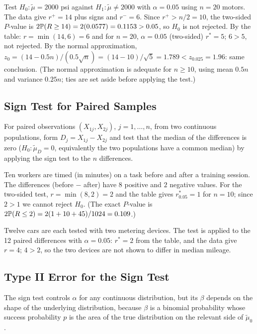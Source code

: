 \begin{example}
Test $H_0:\tilde\mu=2000$ psi against $H_1:\tilde\mu\ne2000$ with $\alpha=0.05$ using $n=20$ motors. The data give $r^+=14$ plus signs and $r^-=6$. Since $r^+>n/2=10$, the two-sided $P$-value is $2\mathbb{P}(R\ge14)=2(0.0577)=0.1153>0.05$, so $H_0$ is not rejected. By the table: $r=\min(14,6)=6$ and for $n=20$, $\alpha=0.05$ (two-sided) $r^*=5$; $6>5$, not rejected. By the normal approximation, $z_0=(14-0.5n)/(0.5\sqrt n)=(14-10)/\sqrt5=1.789<z_{0.025}=1.96$: same conclusion. (The normal approximation is adequate for $n\ge10$, using mean $0.5n$ and variance $0.25n$; ties are set aside before applying the test.)
\end{example}

\subsection{Sign Test for Paired Samples}

For paired observations $(X_{1j},X_{2j})$, $j=1,\dots,n$, from two continuous populations, form $D_j=X_{1j}-X_{2j}$ and test that the median of the differences is zero ($H_0:\tilde\mu_D=0$, equivalently the two populations have a common median) by applying the sign test to the $n$ differences.

\begin{example}
Ten workers are timed (in minutes) on a task before and after a training session. The differences (before $-$ after) have $8$ positive and $2$ negative values. For the two-sided test, $r=\min(8,2)=2$ and the table gives $r^*_{0.05}=1$ for $n=10$; since $2>1$ we cannot reject $H_0$. (The exact $P$-value is $2\mathbb{P}(R\le2)=2(1+10+45)/1024=0.109$.)
\end{example}

\begin{example}
Twelve cars are each tested with two metering devices. The test is applied to the 12 paired differences with $\alpha=0.05$: $r^*=2$ from the table, and the data give $r=4$; $4>2$, so the two devices are not shown to differ in median mileage.
\end{example}

\subsection{Type II Error for the Sign Test}

The sign test controls $\alpha$ for any continuous distribution, but its $\beta$ depends on the shape of the underlying distribution, because $\beta$ is a binomial probability whose success probability $p$ is the area of the true distribution on the relevant side of $\tilde\mu_0$.

